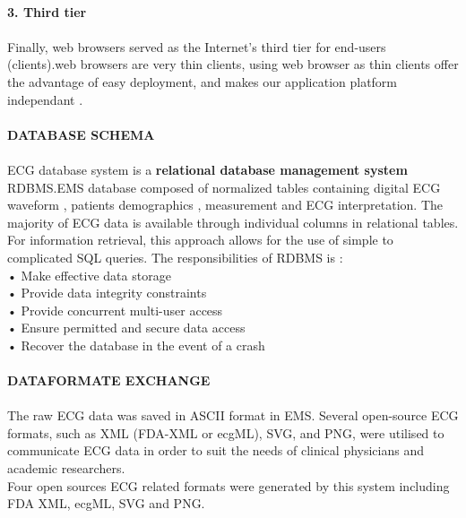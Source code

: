 \documentclass[12pt]{article}
\begin{document}
\paragraph{\textbf{3. Third tier}}
\paragraph{} Finally, web browsers served as the
Internet’s third tier for end-users (clients).web browsers are very thin clients, using web browser as thin clients offer the advantage of easy deployment, and makes our application platform independant .
\paragraph{\textbf{DATABASE SCHEMA }}
\paragraph{}ECG database system is a \textbf{relational database management system} RDBMS.EMS database composed of normalized tables containing digital ECG waveform , patients demographics , measurement and ECG interpretation. The majority of ECG data is available through individual columns in relational tables. For information retrieval, this approach allows for the use of simple to complicated SQL queries. The responsibilities of RDBMS is  : \\ • Make effective data storage\\ • Provide data integrity constraints\\ • Provide concurrent multi-user access\\ • Ensure permitted and secure data access\\ • Recover the database in the event of a crash
\paragraph{\textbf{DATAFORMATE EXCHANGE}}

\paragraph{} The raw ECG data was saved in ASCII format in EMS. Several open-source ECG formats, such as XML (FDA-XML or ecgML), SVG, and PNG, were utilised to communicate ECG data in order to suit the needs of clinical physicians and academic researchers.\\ Four open sources ECG related formats were generated by this system including FDA XML, ecgML, SVG and PNG.
\end{document}
